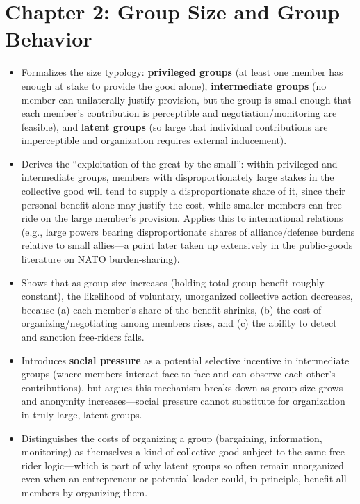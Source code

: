 \documentclass[12pt]{article}
\begin{document}
\section{Chapter 2: Group Size and Group Behavior}

\begin{itemize}[leftmargin=*, itemsep=4pt]
    \item Formalizes the size typology: \textbf{privileged groups} (at least one member has enough at stake to provide the good alone), \textbf{intermediate groups} (no member can unilaterally justify provision, but the group is small enough that each member's contribution is perceptible and negotiation/monitoring are feasible), and \textbf{latent groups} (so large that individual contributions are imperceptible and organization requires external inducement).
    \item Derives the ``exploitation of the great by the small'': within privileged and intermediate groups, members with disproportionately large stakes in the collective good will tend to supply a disproportionate share of it, since their personal benefit alone may justify the cost, while smaller members can free-ride on the large member's provision. Applies this to international relations (e.g., large powers bearing disproportionate shares of alliance/defense burdens relative to small allies---a point later taken up extensively in the public-goods literature on NATO burden-sharing).
    \item Shows that as group size increases (holding total group benefit roughly constant), the likelihood of voluntary, unorganized collective action decreases, because (a) each member's share of the benefit shrinks, (b) the cost of organizing/negotiating among members rises, and (c) the ability to detect and sanction free-riders falls.
    \item Introduces \textbf{social pressure} as a potential selective incentive in intermediate groups (where members interact face-to-face and can observe each other's contributions), but argues this mechanism breaks down as group size grows and anonymity increases---social pressure cannot substitute for organization in truly large, latent groups.
    \item Distinguishes the costs of organizing a group (bargaining, information, monitoring) as themselves a kind of collective good subject to the same free-rider logic---which is part of why latent groups so often remain unorganized even when an entrepreneur or potential leader could, in principle, benefit all members by organizing them.
\end{itemize}
\end{document}
